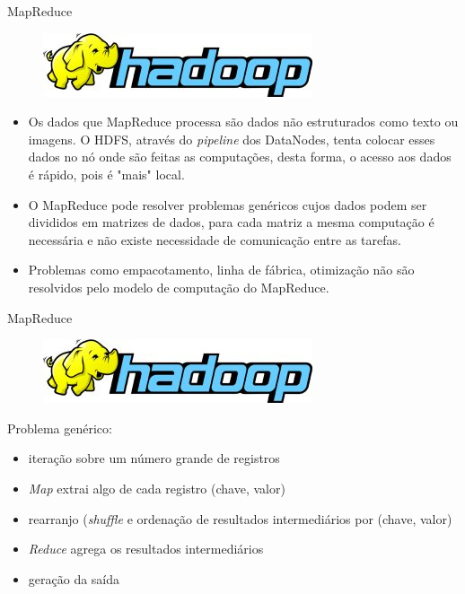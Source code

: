   \begin{frame}{MapReduce}

    \begin{figure}[hb]
      \centering
      \includegraphics[scale=2]{hadoop-logo.jpg}
    \end{figure}

     \begin{itemize}
       \item<1-> Os dados que MapReduce processa são dados não estruturados como texto ou imagens. O HDFS, através do \emph{pipeline} dos DataNodes, tenta colocar esses dados no nó onde são feitas as computações, desta forma, o acesso aos dados é rápido, pois é "mais" local.
       \item<2-> O MapReduce pode resolver problemas genéricos cujos dados podem ser divididos em matrizes de dados, para cada matriz a mesma computação é necessária e não existe necessidade de comunicação entre as tarefas.
       \item<3-> Problemas como empacotamento, linha de fábrica, otimização não são resolvidos pelo modelo de computação do MapReduce.
     \end{itemize}

  \end{frame}

  \begin{frame}{MapReduce}

    \begin{figure}[hb]
      \centering
      \includegraphics[scale=2]{hadoop-logo.jpg}
    \end{figure}

Problema genérico:
\begin{itemize}
   \item iteração sobre um número grande de registros
   \item \emph{Map} extrai algo de cada registro (chave, valor)
   \item rearranjo (\emph{shuffle} e ordenação de resultados intermediários por (chave, valor)
   \item \emph{Reduce} agrega os resultados intermediários 
   \item geração da saída
\end{itemize}

  \end{frame}


